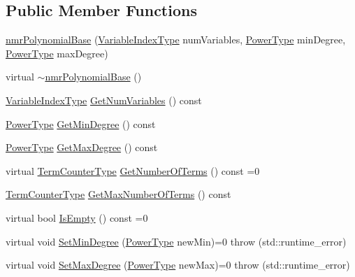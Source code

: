 \subsection*{Public Member Functions}
\begin{DoxyCompactItemize}
\item 
\hyperlink{classnmr_polynomial_base_afab6c489df6b895fd9b73561d0d6c04e}{nmr\-Polynomial\-Base} (\hyperlink{classnmr_polynomial_base_aae95477e451ddc7d3ee3f41cbdaadde2}{Variable\-Index\-Type} num\-Variables, \hyperlink{classnmr_polynomial_base_a58607c884bf2e6725a77ed4d9e14ba26}{Power\-Type} min\-Degree, \hyperlink{classnmr_polynomial_base_a58607c884bf2e6725a77ed4d9e14ba26}{Power\-Type} max\-Degree)
\item 
virtual \hyperlink{classnmr_polynomial_base_a11470f43d93f7857f903f42df6947922}{$\sim$nmr\-Polynomial\-Base} ()
\item 
\hyperlink{classnmr_polynomial_base_aae95477e451ddc7d3ee3f41cbdaadde2}{Variable\-Index\-Type} \hyperlink{classnmr_polynomial_base_a28d1473098dd14dd2463581ed65c8c6c}{Get\-Num\-Variables} () const 
\item 
\hyperlink{classnmr_polynomial_base_a58607c884bf2e6725a77ed4d9e14ba26}{Power\-Type} \hyperlink{classnmr_polynomial_base_a3ac2485119d1196e61c7b46935b4b531}{Get\-Min\-Degree} () const 
\item 
\hyperlink{classnmr_polynomial_base_a58607c884bf2e6725a77ed4d9e14ba26}{Power\-Type} \hyperlink{classnmr_polynomial_base_aae62bf8006242c1ec1b6e394104b479e}{Get\-Max\-Degree} () const 
\item 
virtual \hyperlink{classnmr_polynomial_base_a4b0abd66b12b6f5bfb30d0eb1607e661}{Term\-Counter\-Type} \hyperlink{classnmr_polynomial_base_a69f1c0053d6ee20693ea719d32a159ee}{Get\-Number\-Of\-Terms} () const =0
\item 
\hyperlink{classnmr_polynomial_base_a4b0abd66b12b6f5bfb30d0eb1607e661}{Term\-Counter\-Type} \hyperlink{classnmr_polynomial_base_af5e9c5ce95676316e011aaeb765bfe8f}{Get\-Max\-Number\-Of\-Terms} () const 
\item 
virtual bool \hyperlink{classnmr_polynomial_base_abd683b694cb97b6cffc95752258a65ba}{Is\-Empty} () const =0
\item 
virtual void \hyperlink{classnmr_polynomial_base_af36d01115bacbb1d8aced67d56cae75b}{Set\-Min\-Degree} (\hyperlink{classnmr_polynomial_base_a58607c884bf2e6725a77ed4d9e14ba26}{Power\-Type} new\-Min)=0  throw (std\-::runtime\-\_\-error)
\item 
virtual void \hyperlink{classnmr_polynomial_base_ab6bd189c5aa67120857a93c6d93ff1b3}{Set\-Max\-Degree} (\hyperlink{classnmr_polynomial_base_a58607c884bf2e6725a77ed4d9e14ba26}{Power\-Type} new\-Max)=0  throw (std\-::runtime\-\_\-error)

\end{DoxyCompactItemize}
